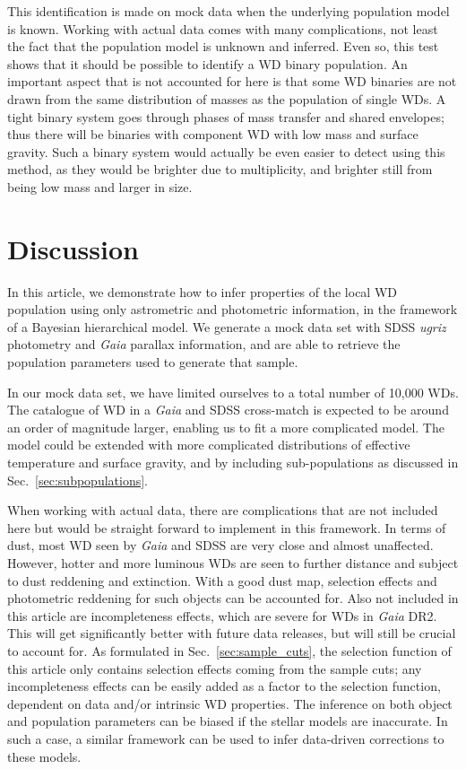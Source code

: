 \documentclass[fleqn,usenatbib]{mnras}
\begin{document}
This identification is made on mock data when the underlying population model is known. Working with actual data comes with many complications, not least the fact that the population model is unknown and inferred. Even so, this test shows that it should be possible to identify a WD binary population. An important aspect that is not accounted for here is that some WD binaries are not drawn from the same distribution of masses as the population of single WDs. A tight binary system goes through phases of mass transfer and shared envelopes; thus there will be binaries with component WD with low mass and surface gravity. Such a binary system would actually be even easier to detect using this method, as they would be brighter due to multiplicity, and brighter still from being low mass and larger in size.







\section{Discussion}\label{sec:discussion}

In this article, we demonstrate how to infer properties of the local WD population using only astrometric and photometric information, in the framework of a Bayesian hierarchical model. We generate a mock data set with SDSS \emph{ugriz} photometry and \emph{Gaia} parallax information, and are able to retrieve the population parameters used to generate that sample.

In our mock data set, we have limited ourselves to a total number of 10,000 WDs. The catalogue of WD in a \emph{Gaia} and SDSS cross-match is expected to be around an order of magnitude larger, enabling us to fit a more complicated model. The model could be extended with more complicated distributions of effective temperature and surface gravity, and by including sub-populations as discussed in Sec.~\ref{sec:subpopulations}.

When working with actual data, there are complications that are not included here but would be straight forward to implement in this framework. In terms of dust, most WD seen by \emph{Gaia} and SDSS are very close and almost unaffected. However, hotter and more luminous WDs are seen to further distance and subject to dust reddening and extinction. With a good dust map, selection effects and photometric reddening for such objects can be accounted for. Also not included in this article are incompleteness effects, which are severe for WDs in \emph{Gaia} DR2. This will get significantly better with future data releases, but will still be crucial to account for. As formulated in Sec.~\ref{sec:sample_cuts}, the selection function of this article only contains selection effects coming from the sample cuts; any incompleteness effects can be easily added as a factor to the selection function, dependent on data and/or intrinsic WD properties. The inference on both object and population parameters can be biased if the stellar models are inaccurate. In such a case, a similar framework can be used to infer data-driven corrections to these models.
\end{document}
